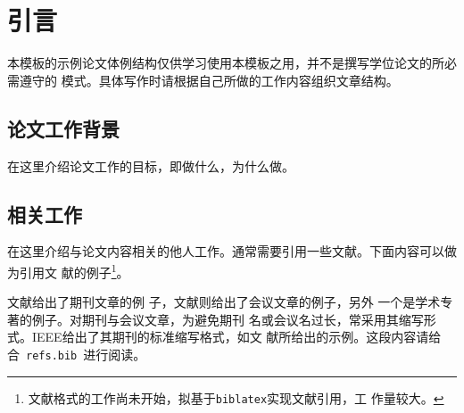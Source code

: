 
\chapter{引言}
\label{cha:intro}

本模板的示例论文体例结构仅供学习使用本模板之用，并不是撰写学位论文的所必需遵守的
模式。具体写作时请根据自己所做的工作内容组织文章结构。

\section{论文工作背景}
\label{sec:motivation}

在这里介绍论文工作的目标，即做什么，为什么做。

\section{相关工作}
\label{sec:related-works}

在这里介绍与论文内容相关的他人工作。通常需要引用一些文献。下面内容可以做为引用文
献的例子\footnote{文献格式的工作尚未开始，拟基于\texttt{biblatex}实现文献引用，工
  作量较大。}。

文献给出了期刊文章的例
子，文献则给出了会议文章的例子，另外
一个是学术专著\cite{book11:_examp_book_title}的例子。对期刊与会议文章，为避免期刊
名或会议名过长，常采用其缩写形式。IEEE给出了其期刊的标准缩写格式，如文
献所给出的示例。这段内容请给
合~\texttt{refs.bib}~进行阅读。

